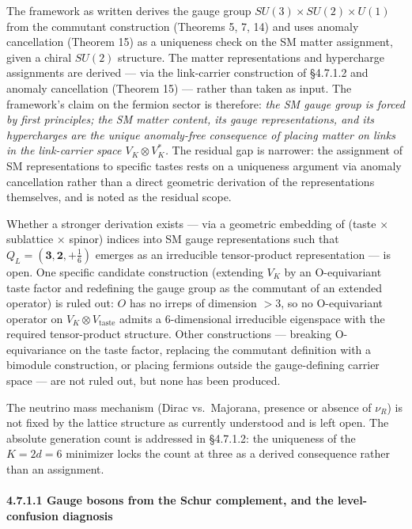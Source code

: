 \documentclass[
]{article}
\begin{document}
The framework as written derives the gauge group
\(SU(3) \times SU(2) \times U(1)\) from the commutant construction
(Theorems 5, 7, 14) and uses anomaly cancellation (Theorem 15) as a
uniqueness check on the SM matter assignment, given a chiral \(SU(2)\)
structure. The matter representations and hypercharge assignments are
derived --- via the link-carrier construction of §4.7.1.2 and anomaly
cancellation (Theorem 15) --- rather than taken as input. The
framework's claim on the fermion sector is therefore: \emph{the SM gauge
group is forced by first principles; the SM matter content, its gauge
representations, and its hypercharges are the unique anomaly-free
consequence of placing matter on links in the link-carrier space
\(V_K \otimes V_K^*\).} The residual gap is narrower: the assignment of
SM representations to specific tastes rests on a uniqueness argument via
anomaly cancellation rather than a direct geometric derivation of the
representations themselves, and is noted as the residual scope.

Whether a stronger derivation exists --- via a geometric embedding of
(taste × sublattice × spinor) indices into SM gauge representations such
that \(Q_L = (\mathbf{3}, \mathbf{2}, +\tfrac{1}{6})\) emerges as an
irreducible tensor-product representation --- is open. One specific
candidate construction (extending \(V_K\) by an O-equivariant taste
factor and redefining the gauge group as the commutant of an extended
operator) is ruled out: \(O\) has no irreps of dimension \(> 3\), so no
O-equivariant operator on \(V_K \otimes V_\text{taste}\) admits a
6-dimensional irreducible eigenspace with the required tensor-product
structure. Other constructions --- breaking O-equivariance on the taste
factor, replacing the commutant definition with a bimodule construction,
or placing fermions outside the gauge-defining carrier space --- are not
ruled out, but none has been produced.

The neutrino mass mechanism (Dirac vs.~Majorana, presence or absence of
\(\nu_R\)) is not fixed by the lattice structure as currently understood
and is left open. The absolute generation count is addressed in
§4.7.1.2: the uniqueness of the \(K = 2d = 6\) minimizer locks the count
at three as a derived consequence rather than an assignment.

\hypertarget{gauge-bosons-from-the-schur-complement-and-the-level-confusion-diagnosis}{%
\paragraph{4.7.1.1 Gauge bosons from the Schur complement, and the
level-confusion
diagnosis}\label{gauge-bosons-from-the-schur-complement-and-the-level-confusion-diagnosis}}
\end{document}
